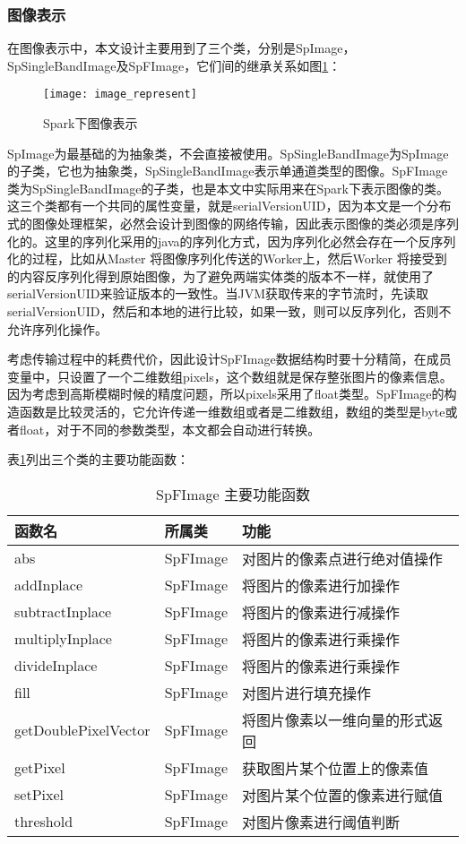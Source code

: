 \subsubsection{图像表示}
在图像表示中，本文设计主要用到了三个类，分别是SpImage，SpSingleBandImage及SpFImage，它们间的继承关系如图\ref{fig:image_represent}：
\begin{figure}[htp]
\centering
\texttt{[image: image\_represent]}
\caption{Spark下图像表示}
\label{fig:image_represent}
\end{figure}
SpImage为最基础的为抽象类，不会直接被使用。SpSingleBandImage为SpImage的子类，它也为抽象类，SpSingleBandImage表示单通道类型的图像。SpFImage类为SpSingleBandImage的子类，也是本文中实际用来在Spark下表示图像的类。这三个类都有一个共同的属性变量，就是serialVersionUID，因为本文是一个分布式的图像处理框架，必然会设计到图像的网络传输，因此表示图像的类必须是序列化的。这里的序列化采用的java的序列化方式，因为序列化必然会存在一个反序列化的过程，比如从Master 将图像序列化传送的Worker上，然后Worker 将接受到的内容反序列化得到原始图像，为了避免两端实体类的版本不一样，就使用了serialVersionUID来验证版本的一致性。当JVM获取传来的字节流时，先读取serialVersionUID，然后和本地的进行比较，如果一致，则可以反序列化，否则不允许序列化操作。

考虑传输过程中的耗费代价，因此设计SpFImage数据结构时要十分精简，在成员变量中，只设置了一个二维数组pixels，这个数组就是保存整张图片的像素信息。因为考虑到高斯模糊时候的精度问题，所以pixels采用了float类型。SpFImage的构造函数是比较灵活的，它允许传递一维数组或者是二维数组，数组的类型是byte或者float，对于不同的参数类型，本文都会自动进行转换。

表\ref{tab:SpFImage_function}列出三个类的主要功能函数：
\begin{table}[h] %
\caption{SpFImage 主要功能函数} %
\centering
\label{tab:SpFImage_function}
\begin{tabular}{p{4cm}|p{2cm}|p{6cm}} %
\hline
\hline
函数名  & 所属类 & 功能 \\ %
\hline %
abs  & SpFImage & 对图片的像素点进行绝对值操作\\
\hline
addInplace  & SpFImage & 将图片的像素进行加操作\\
\hline
subtractInplace  & SpFImage & 将图片的像素进行减操作\\
\hline
multiplyInplace  & SpFImage & 将图片的像素进行乘操作\\
\hline
divideInplace  & SpFImage & 将图片的像素进行乘操作\\
\hline
fill  & SpFImage & 对图片进行填充操作\\
\hline
getDoublePixelVector & SpFImage & 将图片像素以一维向量的形式返回\\
\hline
getPixel& SpFImage & 获取图片某个位置上的像素值\\
\hline
setPixel & SpFImage & 对图片某个位置的像素进行赋值\\
\hline
threshold & SpFImage & 对图片像素进行阈值判断\\
\hline
\hline
\end{tabular}
\end{table}
